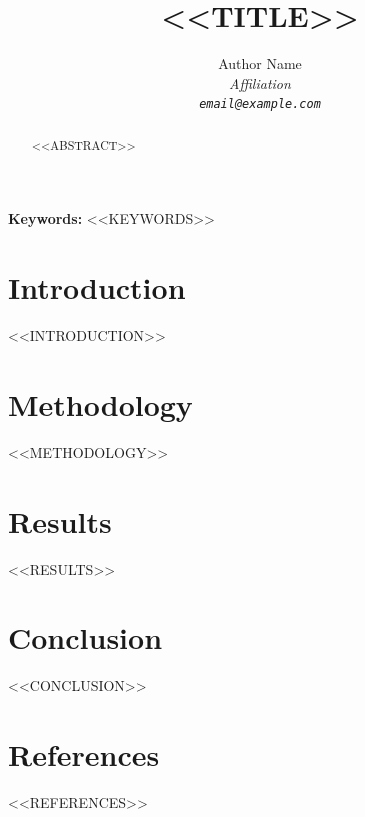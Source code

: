 \documentclass[12pt]{scrartcl}
\title{<<TITLE>>}
\author{Author Name\\[0.3em]
  \small\itshape Affiliation\\
  \small\texttt{email@example.com}}
\date{}
\begin{document}
\maketitle
\thispagestyle{empty}

\begin{abstract}
<<ABSTRACT>>
\end{abstract}

\noindent\textbf{Keywords:} <<KEYWORDS>>

\bigskip

\section{Introduction}
<<INTRODUCTION>>

\section{Methodology}
<<METHODOLOGY>>

\section{Results}
<<RESULTS>>

\section{Conclusion}
<<CONCLUSION>>

\section*{References}
<<REFERENCES>>
\end{document}
